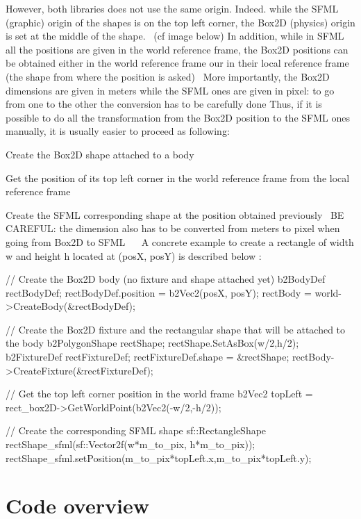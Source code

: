 However, both libraries does not use the same origin. Indeed. while the S\+F\+ML (graphic) origin of the shapes is on the top left corner, the Box2D (physics) origin is set at the middle of the shape.~\newline
 (cf image below)  In addition, while in S\+F\+ML all the positions are given in the world reference frame, the Box2D positions can be obtained either in the world reference frame our in their local reference frame (the shape from where the position is asked)~\newline
 More importantly, the Box2D dimensions are given in meters while the S\+F\+ML ones are given in pixel\+: to go from one to the other the conversion has to be carefully done Thus, if it is possible to do all the transformation from the Box2D position to the S\+F\+ML ones manually, it is usually easier to proceed as following\+:
\begin{DoxyItemize}
\item Create the Box2D shape attached to a body
\item Get the position of its top left corner in the world reference frame from the local reference frame ~\newline

\item Create the S\+F\+ML corresponding shape at the position obtained previously~\newline
 BE C\+A\+R\+E\+F\+UL\+: the dimension also has to be converted from meters to pixel when going from Box2D to S\+F\+ML~\newline
~\newline
 A concrete example to create a rectangle of width w and height h located at (posX, posY) is described below \+: 
\begin{DoxyCode}
\textcolor{comment}{// Create the Box2D body (no fixture and shape attached yet)}
b2BodyDef rectBodyDef;
rectBodyDef.position = b2Vec2(posX, posY);
rectBody = world->CreateBody(&rectBodyDef);

\textcolor{comment}{// Create the Box2D fixture and the rectangular shape that will be attached to the body}
b2PolygonShape rectShape;
rectShape.SetAsBox(w/2,h/2);
b2FixtureDef rectFixtureDef;
rectFixtureDef.shape = &rectShape;
rectBody->CreateFixture(&rectFixtureDef);

\textcolor{comment}{// Get the top left corner position in the world frame}
b2Vec2 topLeft = rect\_box2D->GetWorldPoint(b2Vec2(-w/2,-h/2));

\textcolor{comment}{// Create the corresponding SFML shape}
sf::RectangleShape rectShape\_sfml(sf::Vector2f(w*m\_to\_pix, h*m\_to\_pix));
rectShape\_sfml.setPosition(m\_to\_pix*topLeft.x,m\_to\_pix*topLeft.y);
\end{DoxyCode}

\end{DoxyItemize}\hypertarget{index_struct}{}\section{Code overview}\label{index_struct}
